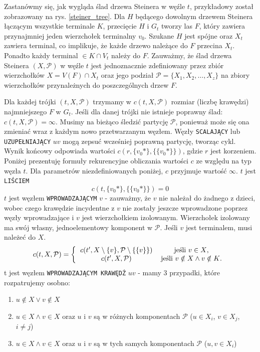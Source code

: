 \documentclass[12pt, oneside]{report}
\begin{document}
Zastanówmy się, jak wygląda ślad drzewa Steinera w węźle $t$, przykładowy został zobrazowany na rys. \ref{steiner_tree}. Dla $H$ będącego dowolnym drzewem Steinera łączącym wszystkie terminale $K$, przecięcie $H$ i $G_t$ tworzy las $F$, który zawiera przynajmniej jeden wierzchołek terminalny $v_0$. Szukane $H$ jest spójne oraz $X_t$ zawiera terminal, co implikuje, że każde drzewo należące do $F$ przecina $X_t$. Ponadto każdy terminal $\in K \cap V_t$ należy do $F$. Zauważmy, że ślad drzewa Steinera $(X, \mathcal{P})$ w węźle $t$ jest jednoznacznie zdefiniowany przez zbiór wierzchołków $X = V(F) \cap X_t$ oraz jego podział $\mathcal{P} = \{X_1, X_2, \dots, X_z\}$ na zbiory wierzchołków przynależnych do poszczególnych drzew $F$.

Dla każdej trójki $(t, X, \mathcal{P})$ trzymamy w $c(t, X, \mathcal{P})$ rozmiar (liczbę krawędzi) najmniejszego $F$ w $G_t$. Jeśli dla danej trójki nie istnieje poprawny ślad: $c(t, X, \mathcal{P}) = \infty$. Musimy na bieżąco śledzić partycję $\mathcal{P}$, ponieważ może się ona zmieniać wraz z każdym nowo przetwarzanym węzłem. Węzły \texttt{SCALAJĄCY} lub \texttt{UZUPEŁNIAJĄCY} $uv$ mogą zepsuć wcześniej poprawną partycję, tworząc cykl. Wynik końcowy odpowiada wartości $c(r, \{v_0*\}, \{\{v_0*\}\})$, gdzie $r$ jest korzeniem. Poniżej prezentuję formuły rekurencyjne obliczania wartości $c$ ze względu na typ węzła $t$. Dla parametrów niezdefiniowanych poniżej, $c$ przyjmuje wartość $\infty$.
\newline\newline
$t$ jest \texttt{LIŚCIEM}
$$c(t, \{v_0*\}, \{\{v_0*\}\}) = 0$$
\newline
$t$ jest węzłem \texttt{WPROWADZAJĄCYM} $v$ - zauważmy, że $v$ nie należał do żadnego z dzieci, wobec czego krawędzie incydentne z $v$ nie zostały jeszcze wprowadzone poprzez węzły wprowadzające i $v$ jest wierzchołkiem izolowanym. Wierzchołek izolowany ma swój własny, jednoelementowy komponent w $\mathcal{P}$. Jeśli $v$ jest terminalem, musi należeć do $X$.
\[
c(t, X, \mathcal{P}) =  
\left \{
  \begin{tabular}{ccc}
  $c(t', X \setminus \{v\}, \mathcal{P} \setminus \{\{v\}\})$ & jeśli $v \in X$,\\
  $c(t', X, \mathcal{P})$ & jeśli $v \notin X \wedge v \notin K$.
  \end{tabular}
\right. 
\]
\newline
t jest węzłem \texttt{WPROWADZAJĄCYM KRAWĘDŹ} $uv$ - mamy 3 przypadki, które rozpatrujemy osobno:

\begin{enumerate}
\item \label{notinx} $u \notin X \lor v \notin X$
\item \label{notinthesamecomponent} $u \in X \land v \in X$ oraz $u$ i $v$ są w różnych komponentach $\mathcal{P}$ ($u \in X_i$, $v \in X_j$, $i \neq j$)
\item \label{edgepossible} $u \in X \land v \in X$ oraz $u$ i $v$ są w tych samych komponentach $\mathcal{P}$ ($u,v \in X_i$)
\end{enumerate} 
\end{document}
